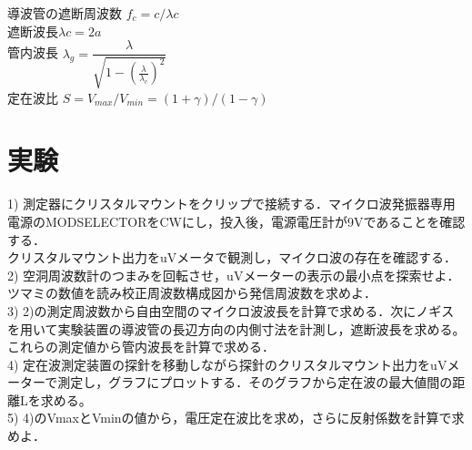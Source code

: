 導波管の遮断周波数 $f_c=c/\lambda c$\\
遮断波長$\lambda c = 2a$\\
管内波長 $\lambda_g = \dfrac{\lambda}{\sqrt{1-(\frac{\lambda}{\lambda_c})^2}}$\\
定在波比 $S=V_{max}/V_{min}=(1+\gamma)/(1-\gamma)$\\

\section{実験}
1) 測定器にクリスタルマウントをクリップで接続する．マイクロ波発振器専用電源のMODSELECTORをCWにし，投入後，電源電圧計が9Vであることを確認する．\\
クリスタルマウント出力をuVメータで観測し，マイクロ波の存在を確認する．\\

2) 空洞周波数計のつまみを回転させ，uVメーターの表示の最小点を探索せよ．ツマミの数値を読み校正周波数構成図から発信周波数を求めよ．\\

3) 2)の測定周波数から自由空間のマイクロ波波長を計算で求める．次にノギスを用いて実験装置の導波管の長辺方向の内側寸法を計測し，遮断波長を求める。これらの測定値から管内波長を計算で求める．\\

4) 定在波測定装置の探針を移動しながら探針のクリスタルマウント出力をuVメーターで測定し，グラフにプロットする．そのグラフから定在波の最大値間の距離Lを求める。\\

5) 4)のVmaxとVminの値から，電圧定在波比を求め，さらに反射係数を計算で求めよ．\\


